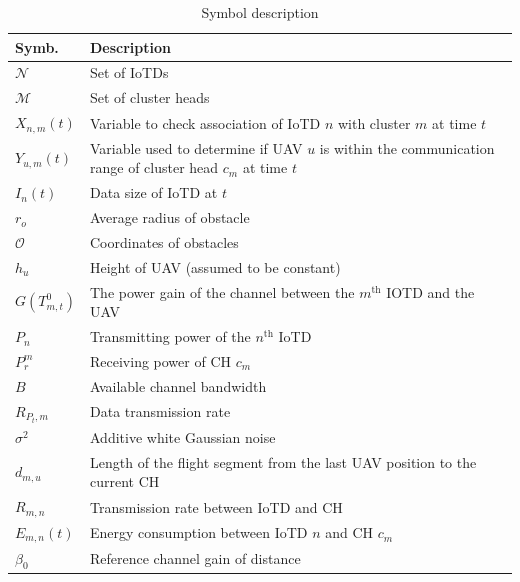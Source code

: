\documentclass[conference]{IEEEtran}
\begin{document}
\begin{table}
    \renewcommand{\arraystretch}{1.3}
    \caption{Symbol description}
    \label{tab:SybDes}
    \begin{tabular}{ p{0.85cm}|p{7.045cm} }
    
        \textbf{Symb.} & \textbf{Description}\\			
        \hline
        $\mathcal{N}$ & Set of IoTDs \\
        \rowcolor{gray!20}
        $\mathcal{M}$ & Set of cluster heads \\
        $X_{n,m}(t)$ & Variable to check association of IoTD $n$ with cluster $m$ at time $t$ \\
        \rowcolor{gray!20}
        $Y_{u,m}(t)$ & Variable used to determine if UAV $u$ is within the communication range of cluster head $c_m$ at time $t$\\
        $I_n(t)$ & Data size of IoTD at $t$\\
        \rowcolor{gray!20}
        $r_o$ & Average radius of obstacle \\
        $\mathcal{O}$ & Coordinates of obstacles \\
        \rowcolor{gray!20}
        $h_u$ & Height of UAV (assumed to be constant) \\
        $G(T_{m,t}^{0})$ & The power gain of the channel between the $m^{\text{th}}$ IOTD and the UAV \\
        \rowcolor{gray!20}
        $P_n$ & Transmitting power of the $n^{\text{th}}$ IoTD \\
        $P_{r}^{m}$ & Receiving power of CH $c_m$ \\
        \rowcolor{gray!20}
        $B$ & Available channel bandwidth \\
        $R_{P_t,m}$ & Data transmission rate \\
        \rowcolor{gray!20}
        $\sigma^{2}$ & Additive white Gaussian noise \\
        $d_{m,u}$ & Length of the flight segment from the last UAV position to the current CH \\
        \rowcolor{gray!20}
        $R_{m,n}$ & Transmission rate between IoTD and CH \\
        $E_{m,n}(t)$ & Energy consumption between IoTD $n$ and CH $c_m$ \\
        \rowcolor{gray!20}
        $\beta_0$ & Reference channel gain of distance \\

\end{tabular}
\end{table}
\end{document}
